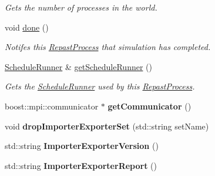 \begin{DoxyCompactItemize}
\begin{DoxyCompactList}\small\item\em Gets the number of processes in the world. \end{DoxyCompactList}\item 
void \hyperlink{classrepast_1_1_repast_process_a410045f31a523ee63f8646d6c7864f94}{done} ()
\begin{DoxyCompactList}\small\item\em Notifes this \hyperlink{classrepast_1_1_repast_process}{Repast\-Process} that simulation has completed. \end{DoxyCompactList}\item 
\hyperlink{classrepast_1_1_schedule_runner}{Schedule\-Runner} \& \hyperlink{classrepast_1_1_repast_process_a056e9a9d3b8383ecd4e223ca30c06817}{get\-Schedule\-Runner} ()
\begin{DoxyCompactList}\small\item\em Gets the \hyperlink{classrepast_1_1_schedule_runner}{Schedule\-Runner} used by this \hyperlink{classrepast_1_1_repast_process}{Repast\-Process}. \end{DoxyCompactList}\item 
\hypertarget{classrepast_1_1_repast_process_a14059c959e8a213bb30c7b414a750ab1}{boost\-::mpi\-::communicator $\ast$ {\bfseries get\-Communicator} ()}\label{classrepast_1_1_repast_process_a14059c959e8a213bb30c7b414a750ab1}

\item 
\hypertarget{classrepast_1_1_repast_process_ae7d551a0294b78c4ebef1de65d7c487e}{void {\bfseries drop\-Importer\-Exporter\-Set} (std\-::string set\-Name)}\label{classrepast_1_1_repast_process_ae7d551a0294b78c4ebef1de65d7c487e}

\item 
\hypertarget{classrepast_1_1_repast_process_a6669a34592bf26e54318bff225be0bc2}{std\-::string {\bfseries Importer\-Exporter\-Version} ()}\label{classrepast_1_1_repast_process_a6669a34592bf26e54318bff225be0bc2}

\item 
\hypertarget{classrepast_1_1_repast_process_a9d747e852bb67271b3d50b311d0ab57c}{std\-::string {\bfseries Importer\-Exporter\-Report} ()}\label{classrepast_1_1_repast_process_a9d747e852bb67271b3d50b311d0ab57c}


\end{DoxyCompactItemize}
